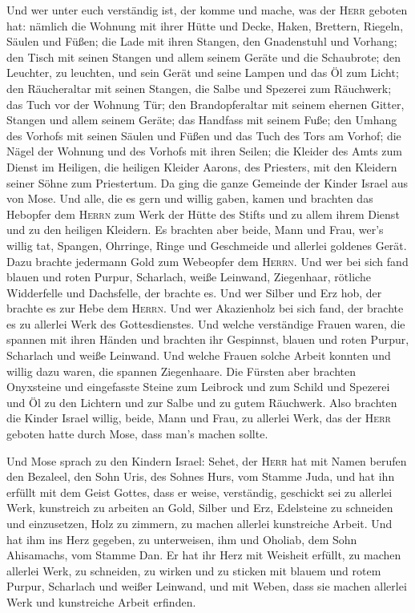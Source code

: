  Und wer unter euch verständig ist, der komme und mache,
was der \textsc{Herr} geboten hat:  nämlich die Wohnung
mit ihrer Hütte und Decke, Haken, Brettern, Riegeln, Säulen und Füßen;
 die Lade mit ihren Stangen, den Gnadenstuhl und Vorhang;
 den Tisch mit seinen Stangen und allem seinem Geräte und
die Schaubrote;  den Leuchter, zu leuchten, und sein
Gerät und seine Lampen und das Öl zum Licht;  den
Räucheraltar mit seinen Stangen, die Salbe und Spezerei zum Räuchwerk;
das Tuch vor der Wohnung Tür;  den Brandopferaltar mit
seinem ehernen Gitter, Stangen und allem seinem Geräte; das Handfass mit
seinem Fuße;  den Umhang des Vorhofs mit seinen Säulen
und Füßen und das Tuch des Tors am Vorhof;  die Nägel der
Wohnung und des Vorhofs mit ihren Seilen;  die Kleider
des Amts zum Dienst im Heiligen, die heiligen Kleider Aarons, des
Priesters, mit den Kleidern seiner Söhne zum Priestertum.
 Da ging die ganze Gemeinde der Kinder Israel aus von
Mose.  Und alle, die es gern und willig gaben, kamen und
brachten das Hebopfer dem \textsc{Herrn} zum Werk der Hütte des Stifts
und zu allem ihrem Dienst und zu den heiligen Kleidern. 
Es brachten aber beide, Mann und Frau, wer's willig tat, Spangen,
Ohrringe, Ringe und Geschmeide und allerlei goldenes Gerät. Dazu brachte
jedermann Gold zum Webeopfer dem \textsc{Herrn}.  Und wer
bei sich fand blauen und roten Purpur, Scharlach, weiße Leinwand,
Ziegenhaar, rötliche Widderfelle und Dachsfelle, der brachte es.
 Und wer Silber und Erz hob, der brachte es zur Hebe dem
\textsc{Herrn}. Und wer Akazienholz bei sich fand, der brachte es zu
allerlei Werk des Gottesdienstes.  Und welche verständige
Frauen waren, die spannen mit ihren Händen und brachten ihr Gespinnst,
blauen und roten Purpur, Scharlach und weiße Leinwand. 
Und welche Frauen solche Arbeit konnten und willig dazu waren, die
spannen Ziegenhaare.  Die Fürsten aber brachten
Onyxsteine und eingefasste Steine zum Leibrock und zum Schild
 und Spezerei und Öl zu den Lichtern und zur Salbe und zu
gutem Räuchwerk.  Also brachten die Kinder Israel willig,
beide, Mann und Frau, zu allerlei Werk, das der \textsc{Herr} geboten
hatte durch Mose, dass man's machen sollte.

 Und Mose sprach zu den Kindern Israel: Sehet, der
\textsc{Herr} hat mit Namen berufen den Bezaleel, den Sohn Uris, des
Sohnes Hurs, vom Stamme Juda,  und hat ihn erfüllt mit
dem Geist Gottes, dass er weise, verständig, geschickt sei zu allerlei
Werk,  kunstreich zu arbeiten an Gold, Silber und Erz,
 Edelsteine zu schneiden und einzusetzen, Holz zu
zimmern, zu machen allerlei kunstreiche Arbeit.  Und hat
ihm ins Herz gegeben, zu unterweisen, ihm und Oholiab, dem Sohn
Ahisamachs, vom Stamme Dan.  Er hat ihr Herz mit Weisheit
erfüllt, zu machen allerlei Werk, zu schneiden, zu wirken und zu sticken
mit blauem und rotem Purpur, Scharlach und weißer Leinwand, und mit
Weben, dass sie machen allerlei Werk und kunstreiche Arbeit erfinden.

